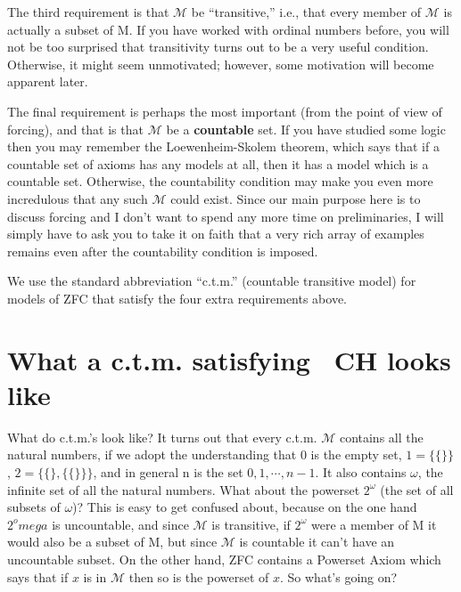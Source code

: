 \documentclass[10pt]{article}
\newcommand\axiom[1]{\textmd{#1}}
\begin{document}
The third requirement is that $\mathcal{M}$ be ``transitive,'' i.e., that every member of $\mathcal M$ is actually a subset of M. If you have worked with ordinal numbers before, you will not be too surprised that transitivity turns out to be a very useful condition. Otherwise, it might seem unmotivated; however, some motivation will become apparent later.

The final requirement is perhaps the most important (from the point of view of forcing), and that is that $\mathcal{M}$ be a \textbf{countable} set. If you have studied some logic then you may remember the Loewenheim-Skolem theorem, which says that if a countable set of axioms has any models at all, then it has a model which is a countable set. Otherwise, the countability condition may make you even more incredulous that any such $\mathcal{M}$ could exist. Since our main purpose here is to discuss forcing and I don't want to spend any more time on preliminaries, I will simply have to ask you to take it on faith that a very rich array of examples remains even after the countability condition is imposed.

We use the standard abbreviation ``c.t.m.'' (countable transitive model) for models of \axiom{ZFC} that satisfy the four extra requirements above.


\section{What a c.t.m. satisfying \axiom{~CH} looks like}

What do c.t.m.'s look like? It turns out that every c.t.m. $\mathcal{M}$ contains all the natural numbers, if we adopt the understanding that 0 is the empty set, $1 = \{\{\}\}$, $2 = \{\{\}, \{\{\}\}\}$, and in general n is the set ${0, 1, \cdots, n-1}$. It also contains $\omega$, the infinite set of all the natural numbers. What about the powerset $2^\omega$ (the set of all subsets of $\omega$)? This is easy to get confused about, because on the one hand $2^omega$ is uncountable, and since $\mathcal{M}$ is transitive, if $2^\omega$ were a member of M it would also be a subset of M, but since $\mathcal{M}$ is countable it can't have an uncountable subset. On the other hand, \axiom{ZFC} contains a Powerset Axiom which says that if $x$ is in $\mathcal M$ then so is the powerset of $x$. So what's going on?
\end{document}
